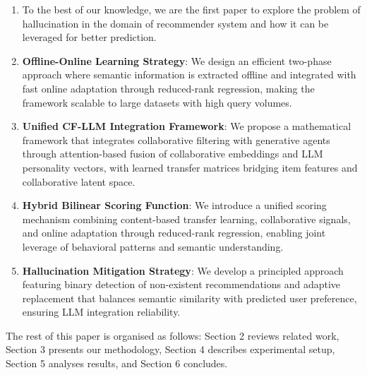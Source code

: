 \documentclass[acmsmall]{acmart}
\begin{document}
\begin{enumerate}
\item To the best of our knowledge, we are the first paper to explore the problem of hallucination in the domain of recommender system and how it can be leveraged for better prediction.
\item \textbf{Offline-Online Learning Strategy}: We design an efficient two-phase approach where semantic information is extracted offline and integrated with fast online adaptation through reduced-rank regression, making the framework scalable to large datasets with high query volumes.
\item \textbf{Unified CF-LLM Integration Framework}: We propose a mathematical framework that integrates collaborative filtering with generative agents through attention-based fusion of collaborative embeddings and LLM personality vectors, with learned transfer matrices bridging item features and collaborative latent space.

\item \textbf{Hybrid Bilinear Scoring Function}: We introduce a unified scoring mechanism combining content-based transfer learning, collaborative signals, and online adaptation through reduced-rank regression, enabling joint leverage of behavioral patterns and semantic understanding.

\item \textbf{Hallucination Mitigation Strategy}: We develop a principled approach featuring binary detection of non-existent recommendations and adaptive replacement that balances semantic similarity with predicted user preference, ensuring LLM integration reliability.

\end{enumerate}


The rest of this paper is organised as follows: Section 2 reviews related work, Section 3 presents our methodology, Section 4 describes experimental setup, Section 5 analyses results, and Section 6 concludes.

\end{document}
